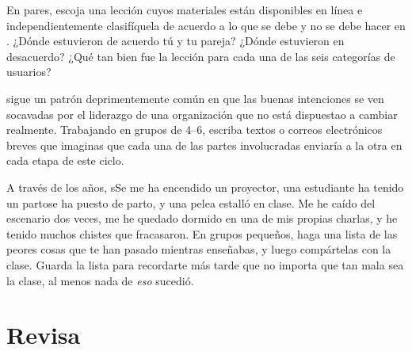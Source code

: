 
En pares,
escoja una lección cuyos materiales están disponibles en línea
e independientemente clasifíquela de acuerdo a lo que se debe y no se debe hacer en
.
¿Dónde estuvieron de acuerdo tú y tu pareja?
¿Dónde estuvieron en desacuerdo?
¿Qué tan bien fue la lección para cada una de las seis categorías de usuarios?


\cite{Coco2018} sigue un patrón deprimentemente común
en que las buenas intenciones se ven socavadas por
el liderazgo de una organización que no está dispuestao a cambiar realmente.
Trabajando en grupos de 4--6,
escriba textos o correos electrónicos breves que imaginas que cada una de las partes involucradas enviaría a la otra
en cada etapa de este ciclo.


A través de los años,
sSe me ha encendido un proyector,
una estudiante ha tenido un partose ha puesto de parto,
y una pelea estalló en clase.
Me he caído del escenario dos veces,
me he quedado dormido en una de mis propias charlas,
y he tenido muchos chistes que fracasaron.
En grupos pequeños,
haga una lista de las peores cosas que te han pasado mientras enseñabas,
y luego compártelas con la clase.
Guarda la lista para recordarte más tarde que no importa que tan mala sea la clase,
al menos nada de \emph{eso} sucedió.

\section*{Revisa}

